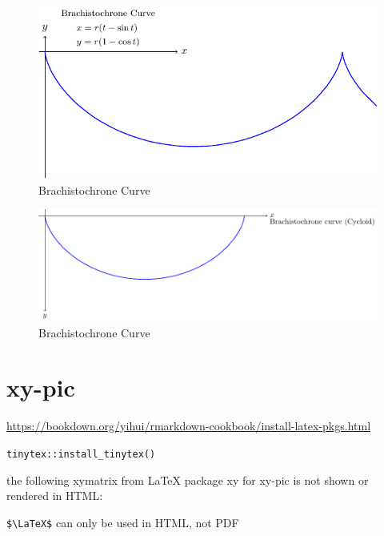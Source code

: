 \documentclass[
]{book}
\theoremstyle{definition}
\theoremstyle{definition}
\theoremstyle{definition}
\theoremstyle{definition}
\theoremstyle{remark}
\begin{document}
\begin{figure}
\includegraphics[width=0.9\linewidth]{202401311000-TiKZ-PgfPlot_files/figure-latex/unnamed-chunk-1-1} \caption{Brachistochrone Curve}\label{fig:unnamed-chunk-1}
\end{figure}

\begin{figure}
\includegraphics[width=0.9\linewidth]{202401311000-TiKZ-PgfPlot_files/figure-latex/unnamed-chunk-2-1} \caption{Brachistochrone Curve}\label{fig:unnamed-chunk-2}
\end{figure}

\hypertarget{xy-pic-1}{%
\chapter*{xy-pic}\label{xy-pic-1}}

\url{https://bookdown.org/yihui/rmarkdown-cookbook/install-latex-pkgs.html}

\texttt{tinytex::install\_tinytex()}

the following xymatrix from LaTeX package xy for xy-pic is not shown or rendered in HTML:

\texttt{\$\textbackslash{}LaTeX\$} can only be used in HTML, not PDF

\end{document}
